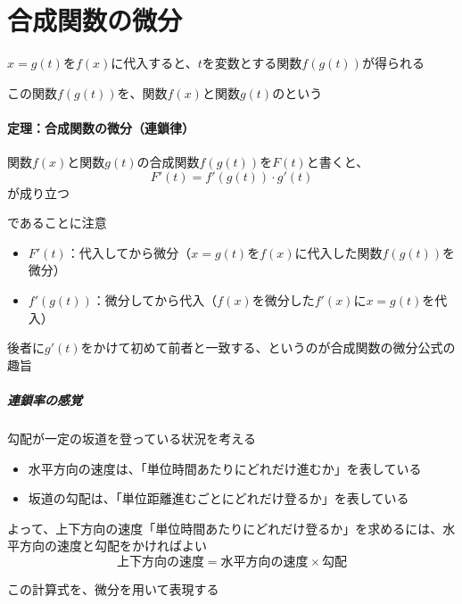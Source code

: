 \documentclass[../book_jiriki_calc]{subfiles}
\begin{document}
\section*{合成関数の微分}

$x=g(t)$を$f(x)$に代入すると、$t$を変数とする関数$f(g(t))$が得られる

この関数$f(g(t))$を、関数$f(x)$と関数$g(t)$のという

\sectionline

\paragraph{定理：合成関数の微分（連鎖律）}\quad

関数$f(x)$と関数$g(t)$の合成関数$f(g(t))$を$F(t)$と書くと、
\begin{equation}
  F'(t) = f'(g(t)) \cdot g'(t)
\end{equation}
が成り立つ

\sectionline

であることに注意

\begin{itemize}
  \item $F'(t)$：代入してから微分（$x=g(t)$を$f(x)$に代入した関数$f(g(t))$を微分）
  \item $f'(g(t))$：微分してから代入（$f(x)$を微分した$f'(x)$に$x=g(t)$を代入）
\end{itemize}

後者に$g'(t)$をかけて初めて前者と一致する、というのが合成関数の微分公式の趣旨

\sectionline

\subparagraph{連鎖率の感覚}

勾配が一定の坂道を登っている状況を考える

\begin{itemize}
  \item 水平方向の速度は、「単位時間あたりにどれだけ進むか」を表している
  \item 坂道の勾配は、「単位距離進むごとにどれだけ登るか」を表している
\end{itemize}

よって、上下方向の速度「単位時間あたりにどれだけ登るか」を求めるには、水平方向の速度と勾配をかければよい
\begin{equation}
  \text{上下方向の速度} = \text{水平方向の速度} \times \text{勾配}
\end{equation}

この計算式を、微分を用いて表現する
\end{document}
